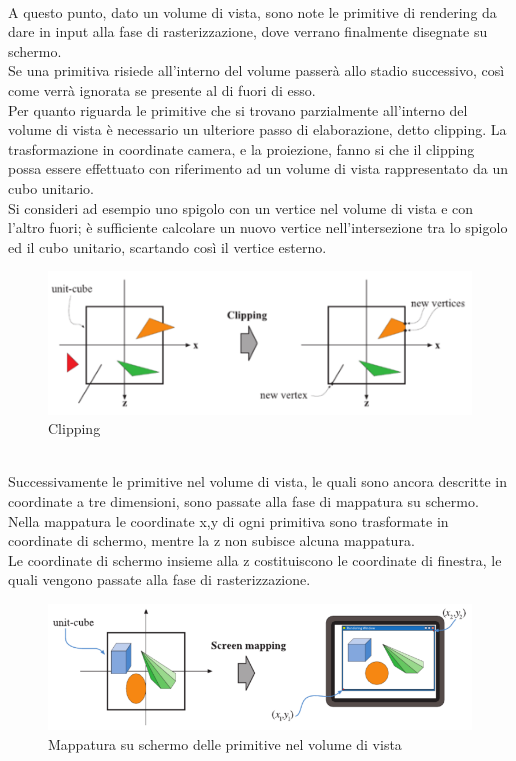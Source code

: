 \\
A questo punto, dato un volume di vista, sono note le primitive di rendering da dare in input alla fase di rasterizzazione, dove verrano finalmente disegnate su schermo.
\\
Se una primitiva risiede all’interno del volume passerà allo stadio successivo, così come verrà ignorata se presente al di fuori di esso.
\\
Per quanto riguarda le primitive che si trovano parzialmente all’interno del volume di vista è necessario un ulteriore passo di elaborazione, detto clipping.
La trasformazione in coordinate camera, e la proiezione, fanno si che il clipping possa essere effettuato con riferimento ad un volume di vista rappresentato da un cubo unitario.
\\
Si consideri ad esempio uno spigolo con un vertice nel volume di vista e con l’altro fuori; è sufficiente calcolare un nuovo vertice nell’intersezione tra lo spigolo ed il cubo unitario, scartando così il vertice esterno.
\\
\begin{figure}[htb]
 \centering
 \includegraphics[width=0.9\linewidth]{images/chapter_stato_arte/stato_arte_clipping.png}\hfill
 \caption[Clipping]{Clipping}
 \label{fig:stato_arte_clipping}
\end{figure}
\\
Successivamente le primitive nel volume di vista, le quali sono ancora descritte in coordinate a tre dimensioni, sono passate alla fase di mappatura su schermo.
\\
Nella mappatura le coordinate x,y di ogni primitiva sono trasformate in coordinate di schermo, mentre la z non subisce alcuna mappatura.
\\
Le coordinate di schermo insieme alla z costituiscono le coordinate di finestra, le quali vengono passate alla fase di rasterizzazione.
\\
\begin{figure}[htb]
 \centering
 \includegraphics[width=0.9\linewidth]{images/chapter_stato_arte/stato_arte_mapping.png}\hfill
 \caption[Mappatura su schermo]{Mappatura su schermo delle primitive nel volume di vista}
 \label{fig:stato_arte_mapping}
\end{figure}
